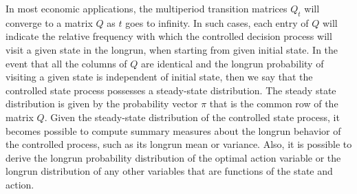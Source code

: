\documentclass[\topdir/lecture\_notes.tex]{subfiles}
\begin{document}
\begin{optional}
In most economic applications, the multiperiod transition matrices $Q_{t}$ will converge to a matrix $Q$ as $t$ goes to infinity. In such cases, each entry of $Q$ will indicate the relative frequency with which the controlled decision process will visit a given state in the longrun, when starting from given initial state. In the event that all the columns of $Q$ are identical and the longrun probability of visiting a given state is independent of initial state, then we say that the controlled state process possesses a steady-state distribution. The steady state distribution is given by the probability vector $\pi$ that is the common row of the matrix $Q$. Given the steady-state distribution of the controlled state process, it becomes possible to compute summary measures about the longrun behavior of the controlled process, such as its longrun mean or variance. Also, it is possible to derive the longrun probability distribution of the optimal action variable or the longrun distribution of any other variables that are functions of the state and action.
\end{optional}
\end{document}
